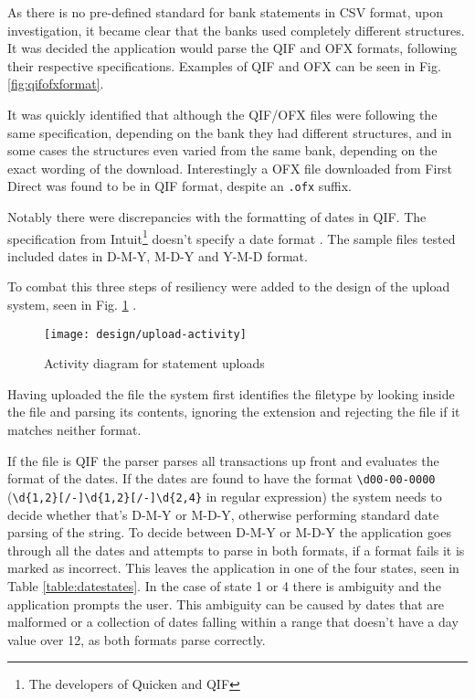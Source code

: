 As there is no pre-defined standard for bank statements in CSV format, upon investigation, it became clear that the banks used completely different structures. It was decided the application would parse the QIF and OFX formats, following their respective specifications. Examples of QIF and OFX can be seen in Fig. \ref{fig:qifofxformat}.

It was quickly identified that although the QIF/OFX files were following the same specification, depending on the bank they had different structures, and in some cases the structures even varied from the same bank, depending on the exact wording of the download. Interestingly a OFX file downloaded from First Direct was found to be in QIF format, despite an \lstinline$.ofx$ suffix.

Notably there were discrepancies with the formatting of dates in QIF. The specification from Intuit\footnote{The developers of Quicken and QIF} doesn't specify a date format \cite{quiken2010qif}. The sample files tested included dates in D-M-Y, M-D-Y and Y-M-D format.



To combat this three steps of resiliency were added to the design of the upload system, seen in Fig. \ref{fig:fileupload} .

\begin{figure}[h]
    \centering
    \texttt{[image: design/upload-activity]}
    \caption{Activity diagram for statement uploads}
    \label{fig:fileupload}
    
    \begin{comment}
(start)->(Upload File)->(Identify File Format)-><a>[QIF]->(Identify Date Format)->(Parse Transactions),
<a>[OFX]->(Parse Transactions)->(Remove Duplicates)->(end),
<a>[Other]->(Reject Upload)
    \end{comment}
\end{figure}

Having uploaded the file the system first identifies the filetype by looking inside the file and parsing its contents, ignoring the extension and rejecting the file if it matches neither format.

If the file is QIF the parser parses all transactions up front and evaluates the format of the dates. If the dates are found to have the format \lstinline$\d00-00-0000$ (\lstinline$\d{1,2}[/-]\d{1,2}[/-]\d{2,4}$ in regular expression) the system needs to decide whether that's D-M-Y or M-D-Y, otherwise performing standard date parsing of the string.
%
To decide between D-M-Y or M-D-Y the application goes through all the dates and attempts to parse in both formats, if a format fails it is marked as incorrect. This leaves the application in one of the four states, seen in Table \ref{table:datestates}. In the case of state 1 or 4 there is ambiguity and the application prompts the user. This ambiguity can be caused by dates that are malformed or a collection of dates falling within a range that doesn't have a day value over 12, as both formats parse correctly. 

